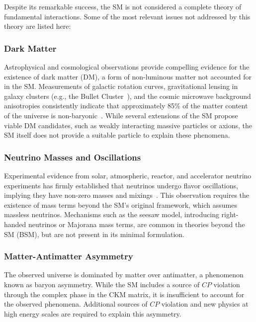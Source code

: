 Despite its remarkable success, the SM is not considered a complete theory of fundamental interactions. Some of the most relevant issues not addressed by this theory are listed here:
\subsubsection*{Dark Matter}

Astrophysical and cosmological observations provide compelling evidence for the existence of dark matter (DM), a form of non-luminous matter not accounted for in the SM. Measurements of galactic rotation curves, gravitational lensing in galaxy clusters (e.g., the Bullet Cluster~\cite{Clowe_2006}), and the cosmic microwave background anisotropies consistently indicate that approximately 85\% of the matter content of the universe is non-baryonic~\cite{Planck}. While several extensions of the SM propose viable DM candidates, such as weakly interacting massive particles or axions, the SM itself does not provide a suitable particle to explain these phenomena.

\subsubsection*{Neutrino Masses and Oscillations}

Experimental evidence from solar, atmospheric, reactor, and accelerator neutrino experiments has firmly established that neutrinos undergo flavor oscillations, implying they have non-zero masses and mixings~\cite{PhysRevD.98.030001}. This observation requires the existence of mass terms beyond the SM's original framework, which assumes massless neutrinos. Mechanisms such as the seesaw model, introducing right-handed neutrinos or Majorana mass terms, are common in theories beyond the SM (BSM), but are not present in its minimal formulation.

\subsubsection*{Matter-Antimatter Asymmetry}

The observed universe is dominated by matter over antimatter, a phenomenon known as baryon asymmetry. While the SM includes a source of $CP$ violation through the complex phase in the CKM matrix, it is insufficient to account for the observed phenomena. Additional sources of $CP$ violation and new physics at high energy scales are required to explain this asymmetry.

